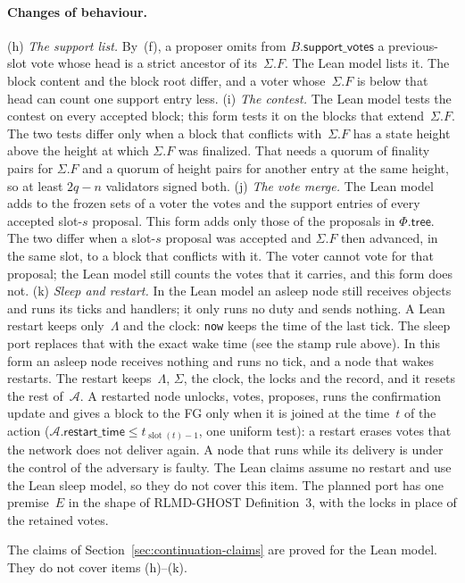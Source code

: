 \documentclass{article}
\newcommand{\slot}{\operatorname{slot}}
\newcommand{\AC}{\mathcal A}
\newcommand{\Fr}{\Phi}
\newcommand{\tree}{\mathsf{tree}}
\newcommand{\restartTime}{\mathsf{restart\_time}}
\begin{document}
\paragraph{Changes of behaviour.}
(h) \emph{The support list.}  By~(f), a proposer omits from
$B.\mathsf{support\_votes}$ a previous-slot vote whose head is a strict
ancestor of its~$\Sigma.F$.  The Lean model lists it.  The block content
and the block root differ, and a voter whose~$\Sigma.F$ is below that
head can count one support entry less.
(i) \emph{The contest.}  The Lean model tests the contest on every
accepted block; this form tests it on the blocks that
extend~$\Sigma.F$.  The two tests differ only when a block that conflicts
with~$\Sigma.F$ has a state height above the height at which $\Sigma.F$
was finalized.  That needs a quorum of finality pairs for $\Sigma.F$ and
a quorum of height pairs for another entry at the same height, so at
least $2q-n$ validators signed both.
(j) \emph{The vote merge.}  The Lean model adds to the frozen sets of a
voter the votes and the support entries of every accepted slot-$s$
proposal.  This form adds only those of the proposals in $\Fr.\tree$.
The two differ when a slot-$s$ proposal was accepted and $\Sigma.F$ then
advanced, in the same slot, to a block that conflicts with it.  The voter
cannot vote for that proposal; the Lean model still counts the votes that
it carries, and this form does not.
(k) \emph{Sleep and restart.}  In the Lean model an asleep node still
receives objects and runs its ticks and handlers; it only runs no duty
and sends nothing.  A Lean restart keeps only~$\Lambda$ and the clock:
\texttt{now} keeps the time of the last tick.  The sleep port replaces that with the exact wake time (see the stamp
rule above).  In this form an asleep node receives nothing and runs no tick, and
a node that wakes restarts.  The restart keeps~$\Lambda$, $\Sigma$, the
clock, the locks and the record, and it resets the rest of~$\AC$.  A
restarted node unlocks, votes, proposes, runs the confirmation update and
gives a block to the FG only when it is joined at the time~$t$ of the
action ($\AC.\restartTime\leq t_{\slot(t)-1}$, one uniform test): a
restart erases votes that the network does not deliver again.  A node
that runs while its delivery is under the control of the adversary is
faulty.  The
Lean claims assume no restart and use the Lean sleep model, so they do not
cover this item.  The
planned port has one premise~$E$ in
the shape of RLMD-GHOST Definition~3, with the locks in place of the
retained votes.

The claims of Section~\ref{sec:continuation-claims} are proved for the
Lean model.  They do not cover items (h)--(k).
\end{document}

